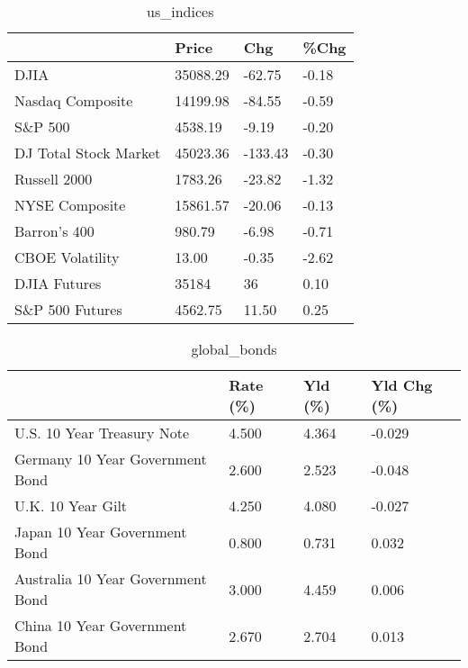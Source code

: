 \documentclass{article}%
\begin{document}
%


\begin{table}[htbp]%
\caption{us\_indices}%
\centering%
\begin{adjustbox}{width=1\textwidth}%
\begin{tabular}{llll}
\toprule
                      &    Price &     Chg &  \%Chg \\
\midrule
                 DJIA & 35088.29 &  -62.75 & -0.18 \\
     Nasdaq Composite & 14199.98 &  -84.55 & -0.59 \\
              S\&P 500 &  4538.19 &   -9.19 & -0.20 \\
DJ Total Stock Market & 45023.36 & -133.43 & -0.30 \\
         Russell 2000 &  1783.26 &  -23.82 & -1.32 \\
       NYSE Composite & 15861.57 &  -20.06 & -0.13 \\
         Barron's 400 &   980.79 &   -6.98 & -0.71 \\
      CBOE Volatility &    13.00 &   -0.35 & -2.62 \\
         DJIA Futures &    35184 &      36 &  0.10 \\
      S\&P 500 Futures &  4562.75 &   11.50 &  0.25 \\
\bottomrule
\end{tabular}
%
\end{adjustbox}%
\end{table}

%


\begin{table}[htbp]%
\caption{global\_bonds}%
\centering%
\begin{adjustbox}{width=1\textwidth}%
\begin{tabular}{llll}
\toprule
                                  & Rate (\%) & Yld (\%) & Yld Chg (\%) \\
\midrule
       U.S. 10 Year Treasury Note &    4.500 &   4.364 &      -0.029 \\
  Germany 10 Year Government Bond &    2.600 &   2.523 &      -0.048 \\
                U.K. 10 Year Gilt &    4.250 &   4.080 &      -0.027 \\
    Japan 10 Year Government Bond &    0.800 &   0.731 &       0.032 \\
Australia 10 Year Government Bond &    3.000 &   4.459 &       0.006 \\
    China 10 Year Government Bond &    2.670 &   2.704 &       0.013 \\
\bottomrule
\end{tabular}
%
\end{adjustbox}%
\end{table}
\end{document}
